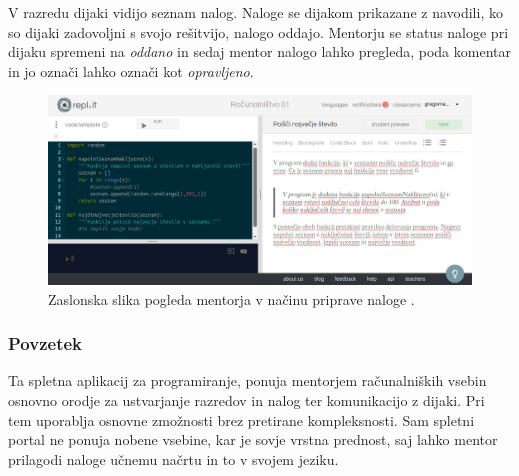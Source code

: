  V razredu dijaki vidijo seznam nalog. Naloge se dijakom
prikazane z navodili, ko so dijaki zadovoljni s svojo rešitvijo,
nalogo oddajo. Mentorju se status naloge pri dijaku spremeni na
\emph{oddano} in sedaj mentor nalogo lahko pregleda, poda komentar in
jo označi lahko označi kot \emph{opravljeno}.

\begin{figure}[h!]
  \centering
    \includegraphics [width=0.75\linewidth, keepaspectratio =
   1] {./images/sc_web/replIT_assigment-v01.png}
   \caption{Zaslonska slika pogleda mentorja v načinu priprave naloge
     \cite{web:replIT}.}
    \label{fig:web:replIT:assigment}
\end{figure}

\subsubsection{Povzetek}
\label{sec:povzetek:replIT}

Ta spletna aplikacij za programiranje, ponuja mentorjem računalniških
vsebin osnovno orodje za ustvarjanje razredov in nalog ter
komunikacijo z dijaki. Pri tem uporablja osnovne zmožnosti brez
pretirane kompleksnosti. Sam spletni portal ne ponuja nobene vsebine,
kar je sovje vrstna prednost, saj lahko mentor prilagodi naloge učnemu
načrtu in to v svojem jeziku.

